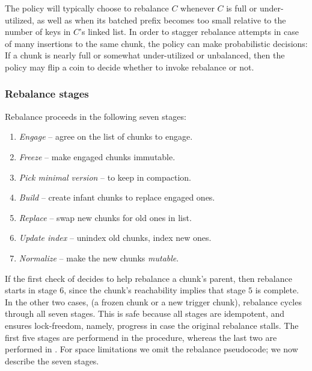 The  policy will typically choose to rebalance $C$ whenever $C$ is full or under-utilized, as well as when
its  batched prefix becomes too small relative to the number of keys in $C$'s linked list.
In order to stagger rebalance attempts in case of many insertions to the same chunk,
the policy can make probabilistic decisions:  If a chunk  is nearly full or somewhat under-utilized or
unbalanced, then the policy may flip a coin to decide whether to invoke rebalance or not.

\subsubsection{Rebalance stages}
\label{sec:rebalance-stages}

\newenvironment{compactenum}
{ \begin{enumerate}
    \setlength{\itemsep}{0pt}
    \setlength{\parskip}{0pt}
    \setlength{\parsep}{2pt}     }
{ \end{enumerate}      }

Rebalance  proceeds in the following seven stages:
\begin{compactenum}
\item \emph{Engage} -- agree on the list of chunks to engage.
\item \emph{Freeze}  -- make engaged chunks immutable.
\item \emph{Pick minimal version} --  to keep in compaction.
\item \emph{Build} -- create infant chunks to replace engaged ones.
\item \emph{Replace} -- swap new chunks for old ones in  list.
\item \emph{Update index} -- unindex old chunks,  index new ones.
\item \emph{Normalize} -- make the new chunks \emph{mutable}.
\end{compactenum}

If the first check of  decides to help rebalance a chunk's parent, then
rebalance starts in stage $6$, since the chunk's reachability implies that stage $5$ is complete.
In the other two cases, (a frozen chunk or a new trigger chunk), rebalance cycles through all seven stages.
This is safe because all stages are idempotent, and ensures lock-freedom, namely, progress in case the original rebalance stalls.
The first five stages are performend in the  procedure, whereas the last two are performed in .
%
For space limitations we omit the rebalance pseudocode; we now describe the seven stages.

